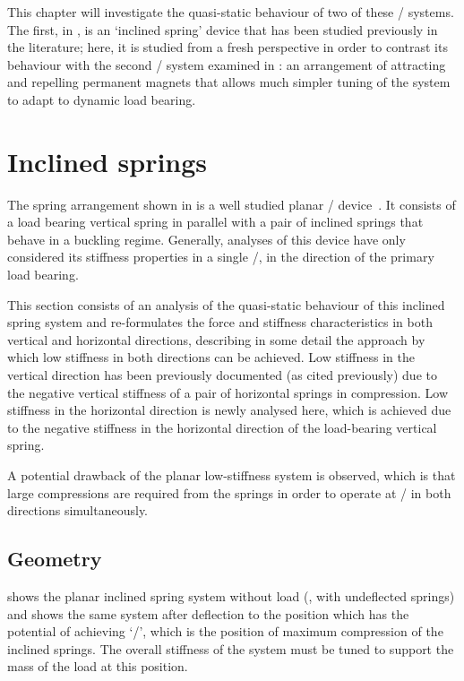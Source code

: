\documentclass[11pt,a4paper]{memoir}
\begin{document}
This chapter will investigate the quasi-static behaviour of two of these \qzs/ systems.
The first, in , is an `inclined spring' device that has been studied previously in the literature; here, it is studied from a fresh perspective in order to contrast its behaviour with the second \qzs/ system examined in : an arrangement of attracting and repelling permanent magnets that allows much simpler tuning of the system to adapt to dynamic load bearing.


\section{Inclined springs}

The spring arrangement shown in  is a well studied planar \qzs/ device~\cite{molyneux1957,alabuzhev1989,carrella2007-jsv,carrella2009-jsv}.
It consists of a load bearing vertical spring in parallel with a pair of inclined springs that behave in a buckling regime.
Generally, analyses of this device have only considered its stiffness properties in a single \dof/, in the direction of the primary load bearing.

This section consists of an analysis of the quasi-static behaviour of this inclined spring system and re-formulates the force and stiffness characteristics in both vertical and horizontal directions, describing in some detail the approach by which low stiffness in both directions can be achieved.
Low stiffness in the vertical direction has been previously documented (as cited previously) due to the negative vertical stiffness of a pair of horizontal springs in compression.
Low stiffness in the horizontal direction is newly analysed here, which is achieved due to the negative stiffness in the horizontal direction of the load-bearing vertical spring.

A potential drawback of the planar low-stiffness system is observed, which is that large compressions are required from the springs in order to operate at \qzs/ in both directions simultaneously.

\subsection{Geometry}

 shows the planar inclined spring system without load (\ie,
with undeflected springs) and  shows the same system after
deflection to the position which has the potential of achieving `\qzs/', which
is the position of maximum compression of the inclined springs. The overall
stiffness of the system must be tuned to support the mass of the load at this
position.
\end{document}
